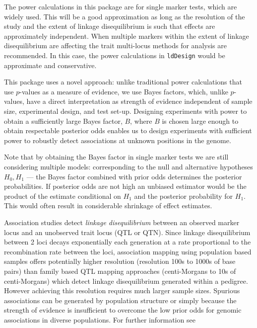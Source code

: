 \documentclass[a4paper,10pt]{amsart}
\def\ldDesign{\texttt{ldDesign}}
\def\BayesQTLBIC{\texttt{BayesQTLBIC}}
\def\eg{\textit{e.g.}}
\begin{document}
The power calculations in this package are for single marker tests,
which are widely used. This will be a good approximation as long as
the resolution of the study and the extent of linkage disequilibrium
is such that effects are approximately independent. When multiple
markers within the extent of linkage disequilibrium are affecting the
trait multi-locus methods for analysis are recommended. 
In this case, the power calculations in \ldDesign{} would
be approximate and conservative.  

This package uses a novel approach: unlike traditional power
calculations that use $p$-values as a measure of evidence, we use
Bayes factors, which, unlike $p$-values, have a direct interpretation
as strength of evidence independent of sample size, experimental
design, and test set-up. Designing experiments with power to obtain a
sufficiently large Bayes factor, $B$, where $B$ is chosen large enough
to obtain respectable posterior odds enables us to design experiments
with sufficient power to robustly detect associations at unknown
positions in the genome. 

Note that by obtaining the Bayes factor in single marker tests we are still
considering multiple models: corresponding to the null and alternative
hypotheses $H_0, H_1$ --- the Bayes factor combined with prior odds
determines the posterior probabilities. If posterior odds are not high
an unbiased estimator would be the product of the estimate conditional
on $H_1$ and the posterior probability for $H_1$. This would often result
in considerable shrinkage of effect estimates.

Association studies detect \textit{linkage disequilibrium} between an
observed marker locus and an unobserved trait locus (QTL or QTN).
Since linkage disequilibrium between 2 loci decays exponentially each
generation at a rate proportional to the recombination rate between
the loci, association mapping using population based samples offers
potentially higher resolution (resolution 100s to 1000s of base
pairs) than family based QTL mapping approaches (centi-Morgans to 10s
of centi-Morgans) which detect linkage disequilibrium generated within
a pedigree.  However achieving this resolution requires much larger
sample sizes.  Spurious associations can be generated by population
structure or simply because the strength of evidence is insufficient
to overcome the low prior odds for genomic associations in diverse
populations.  For further information see 
\citep[and references therein]{Ball2005exptdesignbf,Ball2007AssocMapInPlantsCh8,Ball2007QTLcolocation}
\end{document}
